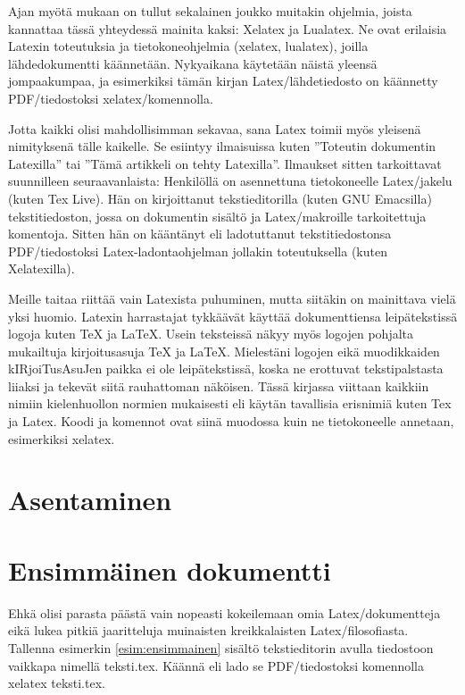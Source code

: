 \documentclass[a4paper,10pt,notitlepage,oneside]{book}
\newcommand{\koodi}[1]{\textsf{#1}}
\begin{document}
Ajan myötä mukaan on tullut sekalainen joukko muitakin ohjelmia, joista
kannattaa tässä yhteydessä mainita kaksi: Xelatex ja Lualatex. Ne ovat
erilaisia Latexin toteutuksia ja tietokone\-ohjelmia (\koodi{xelatex,
  lualatex}), joilla lähdedokumentti käännetään. Nyky\-aikana käytetään
näistä yleensä jompaakumpaa, ja esimerkiksi tämän kirjan
Latex\-/lähdetiedosto on käännetty PDF\-/tiedostoksi
\koodi{xelatex}\-/komennolla.

Jotta kaikki olisi mahdollisimman sekavaa, sana Latex toimii myös
yleisenä nimityksenä tälle kaikelle. Se esiintyy ilmaisuissa kuten
''Toteutin dokumentin Latexilla'' tai ''Tämä artikkeli on tehty
Latexilla''. Ilmaukset sitten tarkoittavat suunnilleen seuraavanlaista:
Henkilöllä on asennettuna tietokoneelle Latex\-/jakelu (kuten Tex Live).
Hän on kirjoittanut teksti\-editorilla (kuten GNU Emacsilla)
tekstitiedoston, jossa on dokumentin sisältö ja Latex\-/makroille
tarkoitettuja komentoja. Sitten hän on kääntänyt eli ladotuttanut
tekstitiedostonsa PDF\-/tiedostoksi Latex-la\-don\-ta\-oh\-jel\-man
jollakin toteutuksella (kuten Xelatexilla).

Meille \marginpar{\Large\LaTeX} taitaa riittää vain Latexista puhuminen,
mutta siitäkin on mainittava vielä yksi huomio. Latexin harrastajat
tykkäävät käyttää dokumenttiensa leipätekstissä logoja kuten \TeX{} ja
\LaTeX{}. Usein teksteissä näkyy myös logojen pohjalta mukailtuja
kirjoitus\-asuja TeX ja LaTeX. Mielestäni logojen eikä muodikkaiden
kIRjoiTus\-AsuJen paikka ei ole leipätekstissä, koska ne erottuvat
tekstipalstasta liiaksi ja tekevät siitä rauhattoman näköisen. Tässä
kirjassa viittaan kaikkiin nimiin kielenhuollon normien mukaisesti eli
käytän tavallisia erisnimiä kuten Tex ja Latex. Koodi ja komennot ovat
siinä muodossa kuin ne tietokoneelle annetaan, esimerkiksi
\koodi{xelatex}.

\section{Asentaminen}
\label{luku:asentaminen}

\section{Ensimmäinen dokumentti}

Ehkä olisi parasta päästä vain nopeasti kokeilemaan omia
Latex\-/dokumentteja eikä lukea pitkiä jaaritteluja muinaisten
kreikkalaisten Latex\-/filosofiasta. Tallenna esimerkin
\ref{esim:ensimmainen} sisältö teksti\-editorin avulla tiedostoon
vaikkapa nimellä teksti.tex. Käännä eli lado se PDF\-/tiedostoksi
komennolla \koodi{xelatex teksti.tex}.
\end{document}
